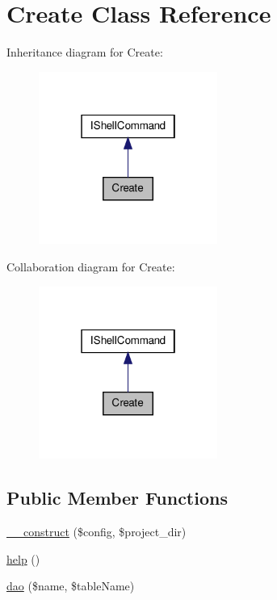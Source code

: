 \hypertarget{class_sec_plus_1_1_create}{
\section{Create Class Reference}
\label{class_sec_plus_1_1_create}
}


Inheritance diagram for Create:
\nopagebreak
\begin{figure}[H]
\begin{center}
\leavevmode
\includegraphics[width=166pt]{class_sec_plus_1_1_create__inherit__graph}
\end{center}
\end{figure}


Collaboration diagram for Create:
\nopagebreak
\begin{figure}[H]
\begin{center}
\leavevmode
\includegraphics[width=166pt]{class_sec_plus_1_1_create__coll__graph}
\end{center}
\end{figure}
\subsection*{Public Member Functions}
\begin{DoxyCompactItemize}
\item 
\hyperlink{class_sec_plus_1_1_create_a9147b452afc1ea079f6dc5c9da834307}{\_\-\_\-construct} (\$config, \$project\_\-dir)
\item 
\hyperlink{class_sec_plus_1_1_create_a91482c4db18186b33acbaf1528a50ddc}{help} ()
\item 
\hyperlink{class_sec_plus_1_1_create_ab3800e6e4d5a0dcdaf684a2f52a133f3}{dao} (\$name, \$tableName)
\end{DoxyCompactItemize}
